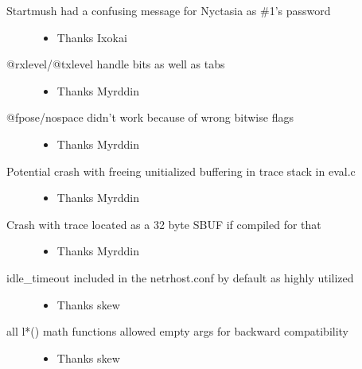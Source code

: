 \documentclass[letterpaper,10pt,english]{sphinxmanual}
\begin{document}
\begin{description}
\item[{Startmush had a confusing message for Nyctasia as \#1’s password}] \leavevmode\begin{itemize}
\item {} 
\sphinxAtStartPar
Thanks Ixokai

\end{itemize}

\item[{@rxlevel/@txlevel handle bits as well as tabs}] \leavevmode\begin{itemize}
\item {} 
\sphinxAtStartPar
Thanks Myrddin

\end{itemize}

\item[{@fpose/nospace didn’t work because of wrong bitwise flags}] \leavevmode\begin{itemize}
\item {} 
\sphinxAtStartPar
Thanks Myrddin

\end{itemize}

\item[{Potential crash with freeing unitialized buffering in trace stack in eval.c}] \leavevmode\begin{itemize}
\item {} 
\sphinxAtStartPar
Thanks Myrddin

\end{itemize}

\item[{Crash with trace located as a 32 byte SBUF if compiled for that}] \leavevmode\begin{itemize}
\item {} 
\sphinxAtStartPar
Thanks Myrddin

\end{itemize}

\item[{idle\_timeout included in the netrhost.conf by default as highly utilized}] \leavevmode\begin{itemize}
\item {} 
\sphinxAtStartPar
Thanks skew

\end{itemize}

\item[{all l*() math functions allowed empty args for backward compatibility}] \leavevmode\begin{itemize}
\item {} 
\sphinxAtStartPar
Thanks skew


\end{itemize}
\end{description}
\end{document}
